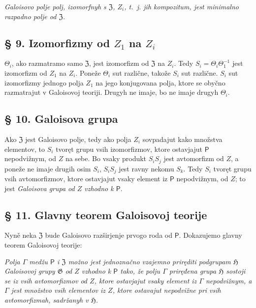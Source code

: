 \documentclass[11pt]{article}
\begin{document}
\emph{Galoisovo polje polj, izomorfnyh s \(\mathfrak Z\), \(Z_i\), t.~j. jih kompozitum, jest minimalno razpadno polje od \(\mathfrak Z\).}

\subsection*{§ 9. Izomorfizmy od \(Z_1\) na \(Z_i\)}\label{die-isomorphismen-von-z1-auf-die-zi}

\(\Theta_i\), ako razmatramo samo \(\mathfrak Z\), jest izomorfizm od \(\mathfrak Z\) na \(Z_i\). Tedy \(S_i=\Theta_i\Theta_1^{-1}\) jest izomorfizm od \(Z_1\) na \(Z_i\). Poneže \(\Theta_i\) sut različne, takože \(S_i\) sut različne. \(S_i\) sut izomorfizmy jednogo polja \(Z_1\) na jego konjugovana polja, ktore se obyčno razmatrajut v Galoisovoj teoriji. Drugyh ne imaje, bo ne imaje drugyh \(\Theta_i\).

\subsection*{§ 10. Galoisova grupa}\label{die-galoissche-gruppe}

Ako \(\mathfrak Z\) jest Galoisovo polje, tedy ako polja \(Z_i\) sovpadajut kako množstva elementov, to \(S_i\) tvoręt grupu vsih izomorfizmov, ktore ostavjajut \(\mathsf P\) nepodvižnym, od \(Z\) na sebe. Bo vsaky produkt \(S_iS_j\) jest avtomorfizm od \(Z\), a poneže ne imaje drugih osim \(S_i\), \(S_iS_j\) jest ravny nekomu \(S_k\). Tedy \(S_i\) tvoręt grupu vsih avtomorfizmov, ktore ostavjajut vsaky element iz \(\mathsf P\) nepodvižnym, od \(Z\); to jest \emph{Galoisova grupa od \(Z\) vzhodno k \(\mathsf P\)}.

\subsection*{§ 11. Glavny teorem Galoisovoj teorije}\label{der-hauptsatz-der-galoisschen-theorie}

Nyně neka \(\mathfrak Z\) bude Galoisovo razširjenje prvogo roda od \(\mathsf P\). Dokazujemo glavny teorem Galoisovoj teorije:

\emph{Polja \(\Gamma\) medžu \(\mathsf P\) i \(\mathfrak Z\) možno jest jednoznačno vzajemno priręditi podgrupam \(\mathfrak H\) Galoisovoj grupy \(\mathfrak G\) od \(Z\) vzhodno k \(\mathsf P\) tako, že polju \(\Gamma\) priręđena grupa \(\mathfrak H\) sostoji se iz vsih avtomorfizmov od \(Z\), ktore ostavjajut vsaky element iz \(\Gamma\) nepodvižnym, a \(\Gamma\) jest množstvo vsih elementov iz \(Z\), ktore ostavajut nepodvižne pri vsih avtomorfizmah, sadržanyh v \(\mathfrak H\).}
\end{document}
